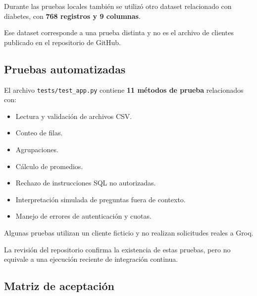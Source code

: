 \documentclass[11pt,a4paper]{article}
\begin{document}
Durante las pruebas locales también se utilizó
otro dataset relacionado con diabetes,
con \textbf{768 registros y 9 columnas}.

Ese dataset corresponde a una prueba distinta
y no es el archivo de clientes publicado
en el repositorio de GitHub.

\subsection{Pruebas automatizadas}

El archivo \texttt{tests/test\_app.py}
contiene \textbf{11 métodos de prueba} relacionados con:

\begin{itemize}
\item Lectura y validación de archivos CSV.
\item Conteo de filas.
\item Agrupaciones.
\item Cálculo de promedios.
\item Rechazo de instrucciones SQL no autorizadas.
\item Interpretación simulada de preguntas fuera de contexto.
\item Manejo de errores de autenticación y cuotas.
\end{itemize}

Algunas pruebas utilizan un cliente ficticio
y no realizan solicitudes reales a Groq.

La revisión del repositorio confirma la existencia
de estas pruebas, pero no equivale a una ejecución
reciente de integración continua.

\subsection{Matriz de aceptación}
\end{document}

